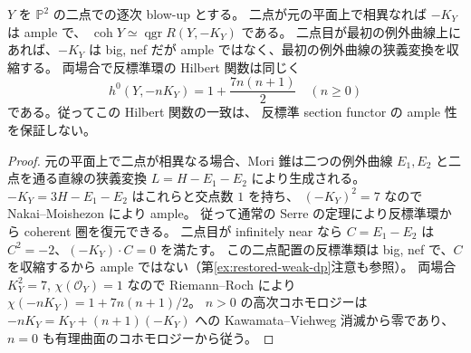 \begin{proposition}
\label{prop:anticanonical-commutative-boundary}
$Y$ を $\mathbb P^2$ の二点での逐次 blow-up とする。
二点が元の平面上で相異なれば $-K_Y$ は ample で、
$\operatorname{coh}Y\simeq\operatorname{qgr}R(Y,-K_Y)$ である。
二点目が最初の例外曲線上にあれば、$-K_Y$ は big, nef だが
ample ではなく、最初の例外曲線の狭義変換を収縮する。
両場合で反標準環の Hilbert 関数は同じく
\[
 h^0(Y,-nK_Y)=1+\frac{7n(n+1)}2\quad(n\ge0)
\]
である。従ってこの Hilbert 関数の一致は、
反標準 section functor の ample 性を保証しない。
\end{proposition}
\begin{proof}
元の平面上で二点が相異なる場合、Mori 錐は二つの例外曲線
$E_1,E_2$ と二点を通る直線の狭義変換
$L=H-E_1-E_2$ により生成される。
$-K_Y=3H-E_1-E_2$ はこれらと交点数 $1$ を持ち、
$(-K_Y)^2=7$ なので Nakai--Moishezon により ample。
従って通常の Serre の定理により反標準環から coherent 圏を復元できる。
二点目が infinitely near なら $C=E_1-E_2$ は
$C^2=-2$、$(-K_Y)\cdot C=0$ を満たす。
この二点配置の反標準類は big, nef で、$C$ を収縮するから
ample ではない（第\ref{ex:restored-weak-dp}注意も参照）。
両場合 $K_Y^2=7$, $\chi(\mathcal O_Y)=1$ なので
Riemann--Roch により $\chi(-nK_Y)=1+7n(n+1)/2$。
$n>0$ の高次コホモロジーは
$-nK_Y=K_Y+(n+1)(-K_Y)$ への Kawamata--Viehweg 消滅から零であり、
$n=0$ も有理曲面のコホモロジーから従う。
\end{proof}
